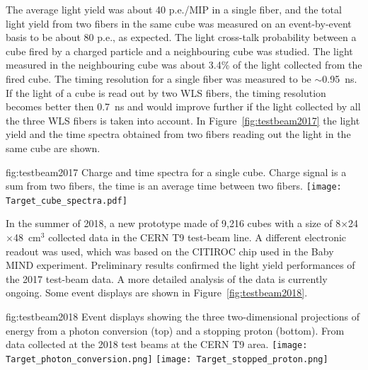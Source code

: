 The average light yield was about 40 p.e./MIP in a single fiber, and the total light yield from two fibers in the same cube was measured on an event-by-event basis to be about 80 p.e., as expected.
The light cross-talk probability between a cube fired by a charged particle and a neighbouring cube was studied. The light measured in the neighbouring cube was about 3.4\% of the light collected from the fired cube. 
The timing resolution for a single fiber was measured to be $\sim$0.95~ns. If the light of a cube is read out by two WLS fibers, the timing resolution becomes better then 0.7~ns and would improve further if the light collected by all the three WLS fibers is taken into account.
In Figure~\ref{fig:testbeam2017} the light yield and the time spectra obtained from two fibers reading out the light in the same cube are shown.

\begin{dunefigure}{fig:testbeam2017}
{Charge and time spectra for a single  cube. Charge signal is a sum from two fibers, the time is an average time between two fibers.}
  \texttt{[image: Target\_cube\_spectra.pdf]}
\end{dunefigure}

In the summer of 2018, a new prototype made of 9,216 cubes with a size of 8$\times$24$\times$48~cm$^{3}$  collected data in the CERN T9 test-beam line.
A different electronic readout was used, which was based on the CITIROC chip used in the Baby MIND experiment.
Preliminary results confirmed the light yield performances of the 2017 test-beam data. A more detailed analysis of the data is currently ongoing.
Some event displays are shown in Figure~\ref{fig:testbeam2018}.


\begin{dunefigure}{fig:testbeam2018}
{Event displays showing the three two-dimensional projections of energy from a photon conversion (top) and a stopping proton (bottom). From data collected at the 2018 test beams at the CERN T9 area.}
\texttt{[image: Target\_photon\_conversion.png]}
\texttt{[image: Target\_stopped\_proton.png]}
\end{dunefigure}

